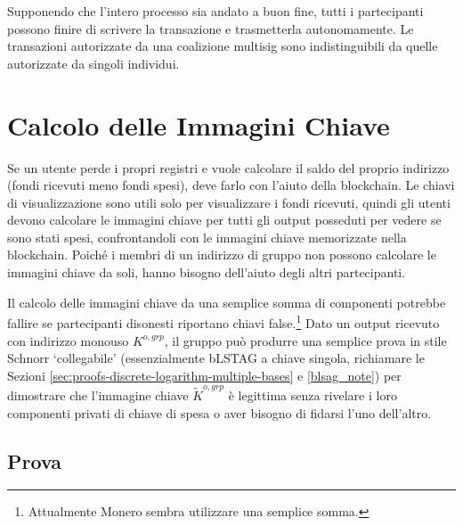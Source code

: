 Supponendo che l'intero processo sia andato a buon fine, tutti i partecipanti possono finire di scrivere la transazione e trasmetterla autonomamente. Le transazioni autorizzate da una coalizione multisig sono indistinguibili da quelle autorizzate da singoli individui.



\section{Calcolo delle Immagini Chiave}
\label{sec:recalculating-key-images-multisig}

Se un utente perde i propri registri e vuole calcolare il saldo del proprio indirizzo (fondi ricevuti meno fondi spesi), deve farlo con l'aiuto della blockchain. Le chiavi di visualizzazione sono utili solo per visualizzare i fondi ricevuti, quindi gli utenti devono calcolare le immagini chiave per tutti gli output posseduti per vedere se sono stati spesi, confrontandoli con le immagini chiave memorizzate nella blockchain. Poiché i membri di un indirizzo di gruppo non possono calcolare le immagini chiave da soli, hanno bisogno dell'aiuto degli altri partecipanti.

Il calcolo delle immagini chiave da una semplice somma di componenti potrebbe fallire se partecipanti disonesti riportano chiavi false.\footnote{Attualmente Monero sembra utilizzare una semplice somma.} Dato un output ricevuto con indirizzo monouso $K^{o,grp}$, il gruppo può produrre una semplice prova in stile Schnorr `collegabile' (essenzialmente bLSTAG a chiave singola, richiamare le Sezioni \ref{sec:proofs-discrete-logarithm-multiple-bases} e \ref{blsag_note}) per dimostrare che l'immagine chiave $\tilde{K}^{o,grp}$ è legittima senza rivelare i loro componenti privati di chiave di spesa o aver bisogno di fidarsi l'uno dell'altro.


\subsection*{Prova}

